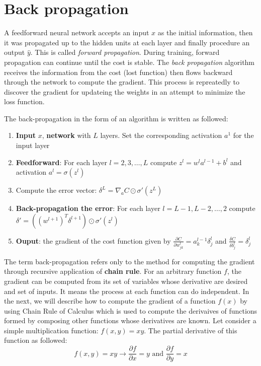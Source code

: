 \section{Back propagation}
A feedforward neural network accepts an input \textbf{$x$} as the initial information, then it was propagated up to the hidden units at each layer and finally procedure an output \textbf{$\hat{y}$}. This is called \textit{forward propagation}. During training, forward propagation can continue until the cost is stable. The \textit{back propagation} algorithm receives the information from the cost (lost function) then flows backward through the network to compute the gradient. This process is repreatedly to discover the gradient for updateing the weights in an attempt to minimize the loss function.

The back-propagation in the form of an algorithm is written as followed:
\begin{enumerate}
	\item \textbf{Input} $x$, \textbf{network} with $L$ layers. Set the corresponding activation $a^1$ for the input layer
	\item \textbf{Feedforward}: For each layer $l = 2, 3, \ldots, L $ compute $z^l = w^la^{l-1} + b^l$ and activation $a^l = \sigma(z^l)$
	\item Compute the error vector: $\delta^L = \nabla_{a}C \odot \sigma'(z^L)$
	\item \textbf{Back-propagation the error}: For each layer $l = L-1, L-2,\ldots, 2$ compute $\delta' = ((w^{l+1})^T \delta^{l+1}) \odot \sigma'(z^l)$
	\item \textbf{Ouput}: the gradient of the cost function given by $\frac{\partial C}{\partial w^l_{jk}} = a^{l-1}_k \delta^l_j$ and $\frac{\delta C}{\delta b^l_j} = \delta^l_j$
\end{enumerate}


The term back-propagation refers only to the method for computing the gradient through recursive application of \textbf{chain rule}. For an arbitrary function $f$, the gradient can be computed from its set of variables whose derivative are desired and set of inputs. It means the process at each function can do independent. In the next, we will describe how to compute the gradient of a function $f(x)$ by using Chain Rule of Calculus which is used to compute the derivaives of functions formed by composing other functions whose derivatives are known.
Let consider a simple multiplication function: $f(x,y) = xy$. The partial derivative of this function as followed:
\begin{equation}
	f(x,y) = xy \rightarrow \frac{\partial f}{\partial x} = y \text{ and } \frac{\partial f}{\partial y} = x
\end{equation}

